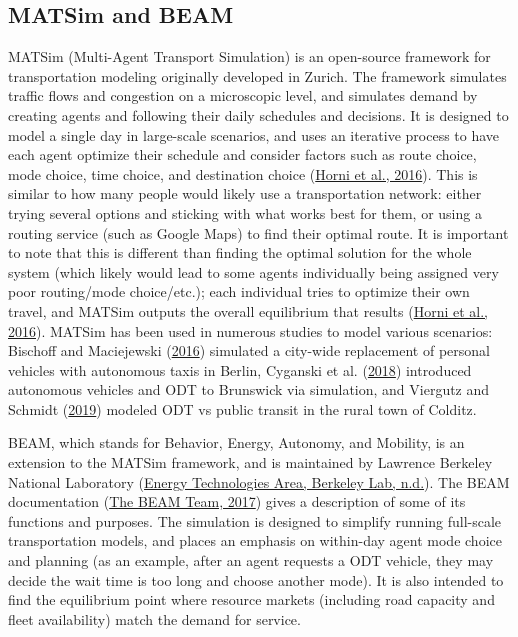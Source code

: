 \documentclass[
]{report}
\begin{document}
\hypertarget{matsim-and-beam}{%
\subsection{MATSim and BEAM}\label{matsim-and-beam}}

MATSim (Multi-Agent Transport Simulation) is an open-source framework for transportation modeling originally developed in Zurich. The framework simulates traffic flows and congestion on a microscopic level, and simulates demand by creating agents and following their daily schedules and decisions. It is designed to model a single day in large-scale scenarios, and uses an iterative process to have each agent optimize their schedule and consider factors such as route choice, mode choice, time choice, and destination choice (\protect\hyperlink{ref-Horni2016}{Horni et al., 2016}). This is similar to how many people would likely use a transportation network: either trying several options and sticking with what works best for them, or using a routing service (such as Google Maps) to find their optimal route. It is important to note that this is different than finding the optimal solution for the whole system (which likely would lead to some agents individually being assigned very poor routing/mode choice/etc.); each individual tries to optimize their own travel, and MATSim outputs the overall equilibrium that results (\protect\hyperlink{ref-Horni2016}{Horni et al., 2016}). MATSim has been used in numerous studies to model various scenarios: Bischoff and Maciejewski (\protect\hyperlink{ref-Bischoff2016}{2016}) simulated a city-wide replacement of personal vehicles with autonomous taxis in Berlin, Cyganski et al. (\protect\hyperlink{ref-Cyganski2018}{2018}) introduced autonomous vehicles and ODT to Brunswick via simulation, and Viergutz and Schmidt (\protect\hyperlink{ref-Viergutz2019}{2019}) modeled ODT vs public transit in the rural town of Colditz.

BEAM, which stands for Behavior, Energy, Autonomy, and Mobility, is an extension to the MATSim framework, and is maintained by Lawrence Berkeley National Laboratory (\protect\hyperlink{ref-BEAMlbnl}{Energy Technologies Area, Berkeley Lab, n.d.}). The BEAM documentation (\protect\hyperlink{ref-beamdocs}{The BEAM Team, 2017}) gives a description of some of its functions and purposes. The simulation is designed to simplify running full-scale transportation models, and places an emphasis on within-day agent mode choice and planning (as an example, after an agent requests a ODT vehicle, they may decide the wait time is too long and choose another mode). It is also intended to find the equilibrium point where resource markets (including road capacity and fleet availability) match the demand for service.
\end{document}
